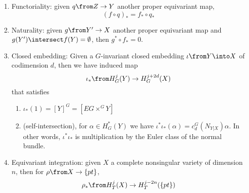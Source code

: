 \documentclass[11pt,leqno,oneside]{amsbook}
\numberwithin{thm}{section}
\begin{document}
\begin{prop}\label{props-of-gysin-maps}
  \begin{enumerate}
  \item Functoriality: given \(q \from Z \to Y\) another proper
    equivariant map, \[
      (f \circ q)_* = f_* \circ q_*
    \]
  \item Naturality: given \(g \from Y' \to X\) another proper
    equivariant map and \(g(Y') \intersect f(Y) = \emptyset\), then
    \(g^* \circ f_* = 0\).
  \item Closed embedding: Given a \(G\)-invariant closed embedding
    \(\iota \from Y \into X\) of codimension \(d\), then we have
    induced map \[
      \iota_* \from H_G^j(Y) \to H_G^{j+2d}(X)
    \]
    that satisfies
    \begin{enumerate}[label=(\roman*)]
    \item \(\iota_*(1) = [Y]^G = [EG \times^G Y]\)
    \item (self-intersection), for \(\alpha \in H_G^*(Y)\) we have
      \(\iota^* \iota_*(\alpha) = c_d^G(N_{Y|X}) \alpha\). In other
      words, \(\iota^* \iota_*\) is multiplication by the Euler class
      of the normal bundle. 
    \end{enumerate}
  \item Equivariant integration: given \(X\) a complete nonsingular
    variety of dimension \(n\), then for \(\rho \from X \to
    \{pt\}\), \[
      \rho_* \from H_T^j(X) \to H_T^{j-2n}(\{pt\})
    \]
  \end{enumerate}
\end{prop}
\end{document}

